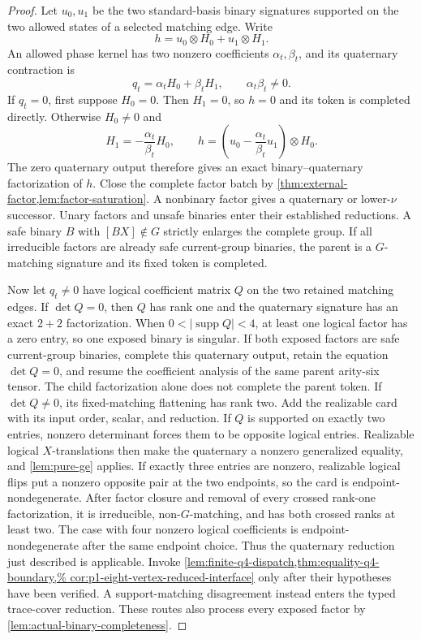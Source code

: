 \documentclass[11pt,letterpaper,onecolumn]{article}
\theoremstyle{plain}
\theoremstyle{definition}
\theoremstyle{remark}
\newcommand{\supp}{\operatorname{supp}}
\begin{document}
\begin{proof}
Let \(u_0,u_1\) be the two standard-basis binary signatures supported on
the two allowed states of a selected matching edge.  Write
\[
 h=u_0\otimes H_0+u_1\otimes H_1.
\]
An allowed phase kernel has two nonzero coefficients
\(\alpha_t,\beta_t\), and its quaternary contraction is
\[
 q_t=\alpha_tH_0+\beta_tH_1,
 \qquad \alpha_t\beta_t\ne0.
\]
If \(q_t=0\), first suppose \(H_0=0\). Then \(H_1=0\), so \(h=0\) and its token is completed directly.  Otherwise \(H_0\ne0\) and
\[
 H_1=-\frac{\alpha_t}{\beta_t}H_0,
 \qquad
 h=\left(u_0-\frac{\alpha_t}{\beta_t}u_1\right)\otimes H_0.
\]
The zero quaternary output therefore gives an exact
binary--quaternary factorization of \(h\).  Close the complete
factor batch by \cref{thm:external-factor,lem:factor-saturation}.  A
nonbinary factor gives a quaternary or lower-\(\nu\) successor. Unary factors and unsafe binaries enter their established
reductions. A safe binary \(B\) with \([BX]\notin G\) strictly enlarges the complete group.  If
all irreducible factors are already safe current-group binaries, the parent is a
\(G\)-matching signature and its fixed token is completed.

Now let \(q_t\ne0\) have logical coefficient matrix \(Q\) on the two retained matching
edges.  If \(\det Q=0\), then \(Q\) has rank one and the quaternary signature has an
exact \(2+2\) factorization.  When \(0<|\supp Q|<4\), at least one
logical factor has a zero entry, so one exposed binary is singular.
If both exposed factors are safe current-group binaries, complete this quaternary output, retain the equation \(\det Q=0\), and resume the coefficient analysis
of the same parent arity-six tensor. The child factorization alone does not complete the
parent token.
If \(\det Q\ne0\), its fixed-matching flattening has rank two.  Add the
realizable card with its input order, scalar, and reduction.  If \(Q\) is
supported on exactly two entries, nonzero determinant forces
them to be opposite logical entries.  Realizable logical \(X\)-translations
then make the quaternary a nonzero generalized equality, and
\cref{lem:pure-ge} applies.  If exactly three entries are nonzero, realizable
logical flips put a nonzero opposite pair at the two endpoints, so the card is
endpoint-nondegenerate.  After factor closure and removal of every
crossed rank-one factorization, it is irreducible, non-\(G\)-matching, and
has both crossed ranks at least two.  The case with four nonzero logical coefficients is
endpoint-nondegenerate after the same endpoint choice.  Thus the
quaternary reduction just described is applicable. Invoke
\cref{lem:finite-q4-dispatch,thm:equality-q4-boundary,%
cor:p1-eight-vertex-reduced-interface} only after their hypotheses have been
verified.  A support-matching disagreement instead enters the typed
trace-cover reduction.  These routes also process every exposed factor by
\cref{lem:actual-binary-completeness}.


\end{proof}
\end{document}
